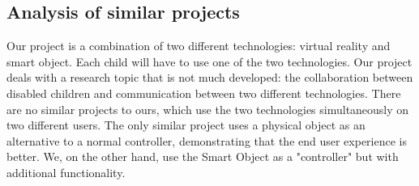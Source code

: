\documentclass [12pt]{article}
\begin{document}
\subsection{Analysis of similar projects}
Our project is a combination of two different technologies: virtual reality and smart object. Each child will have to use one of the two technologies.
Our project deals with a research topic that is not much developed: the collaboration between disabled children and communication between two different technologies.    
There are no similar projects to ours, which use the two technologies simultaneously on two different users.
The only similar project uses a physical object as an alternative to a normal controller, demonstrating that the end user experience is better. We, on the other hand, use the Smart Object as a "controller" but with additional functionality.
\end{document}
